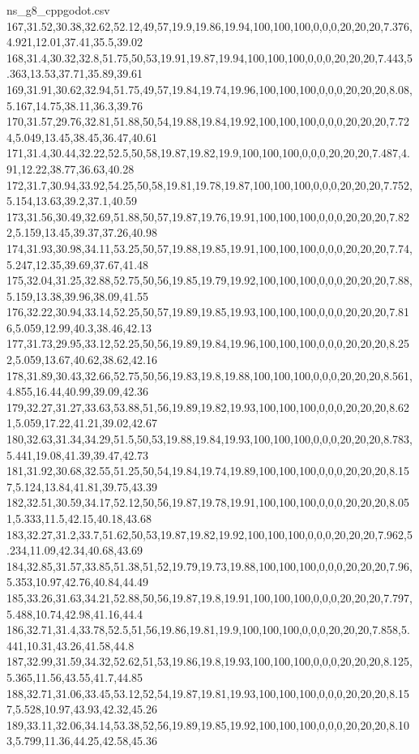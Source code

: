 \begin{filecontents*}[overwrite]{ns_g8_cppgodot.csv}
167,31.52,30.38,32.62,52.12,49,57,19.9,19.86,19.94,100,100,100,0,0,0,20,20,20,7.376,4.921,12.01,37.41,35.5,39.02
168,31.4,30.32,32.8,51.75,50,53,19.91,19.87,19.94,100,100,100,0,0,0,20,20,20,7.443,5.363,13.53,37.71,35.89,39.61
169,31.91,30.62,32.94,51.75,49,57,19.84,19.74,19.96,100,100,100,0,0,0,20,20,20,8.08,5.167,14.75,38.11,36.3,39.76
170,31.57,29.76,32.81,51.88,50,54,19.88,19.84,19.92,100,100,100,0,0,0,20,20,20,7.724,5.049,13.45,38.45,36.47,40.61
171,31.4,30.44,32.22,52.5,50,58,19.87,19.82,19.9,100,100,100,0,0,0,20,20,20,7.487,4.91,12.22,38.77,36.63,40.28
172,31.7,30.94,33.92,54.25,50,58,19.81,19.78,19.87,100,100,100,0,0,0,20,20,20,7.752,5.154,13.63,39.2,37.1,40.59
173,31.56,30.49,32.69,51.88,50,57,19.87,19.76,19.91,100,100,100,0,0,0,20,20,20,7.822,5.159,13.45,39.37,37.26,40.98
174,31.93,30.98,34.11,53.25,50,57,19.88,19.85,19.91,100,100,100,0,0,0,20,20,20,7.74,5.247,12.35,39.69,37.67,41.48
175,32.04,31.25,32.88,52.75,50,56,19.85,19.79,19.92,100,100,100,0,0,0,20,20,20,7.88,5.159,13.38,39.96,38.09,41.55
176,32.22,30.94,33.14,52.25,50,57,19.89,19.85,19.93,100,100,100,0,0,0,20,20,20,7.816,5.059,12.99,40.3,38.46,42.13
177,31.73,29.95,33.12,52.25,50,56,19.89,19.84,19.96,100,100,100,0,0,0,20,20,20,8.252,5.059,13.67,40.62,38.62,42.16
178,31.89,30.43,32.66,52.75,50,56,19.83,19.8,19.88,100,100,100,0,0,0,20,20,20,8.561,4.855,16.44,40.99,39.09,42.36
179,32.27,31.27,33.63,53.88,51,56,19.89,19.82,19.93,100,100,100,0,0,0,20,20,20,8.621,5.059,17.22,41.21,39.02,42.67
180,32.63,31.34,34.29,51.5,50,53,19.88,19.84,19.93,100,100,100,0,0,0,20,20,20,8.783,5.441,19.08,41.39,39.47,42.73
181,31.92,30.68,32.55,51.25,50,54,19.84,19.74,19.89,100,100,100,0,0,0,20,20,20,8.157,5.124,13.84,41.81,39.75,43.39
182,32.51,30.59,34.17,52.12,50,56,19.87,19.78,19.91,100,100,100,0,0,0,20,20,20,8.051,5.333,11.5,42.15,40.18,43.68
183,32.27,31.2,33.7,51.62,50,53,19.87,19.82,19.92,100,100,100,0,0,0,20,20,20,7.962,5.234,11.09,42.34,40.68,43.69
184,32.85,31.57,33.85,51.38,51,52,19.79,19.73,19.88,100,100,100,0,0,0,20,20,20,7.96,5.353,10.97,42.76,40.84,44.49
185,33.26,31.63,34.21,52.88,50,56,19.87,19.8,19.91,100,100,100,0,0,0,20,20,20,7.797,5.488,10.74,42.98,41.16,44.4
186,32.71,31.4,33.78,52.5,51,56,19.86,19.81,19.9,100,100,100,0,0,0,20,20,20,7.858,5.441,10.31,43.26,41.58,44.8
187,32.99,31.59,34.32,52.62,51,53,19.86,19.8,19.93,100,100,100,0,0,0,20,20,20,8.125,5.365,11.56,43.55,41.7,44.85
188,32.71,31.06,33.45,53.12,52,54,19.87,19.81,19.93,100,100,100,0,0,0,20,20,20,8.157,5.528,10.97,43.93,42.32,45.26
189,33.11,32.06,34.14,53.38,52,56,19.89,19.85,19.92,100,100,100,0,0,0,20,20,20,8.103,5.799,11.36,44.25,42.58,45.36

\end{filecontents*}
